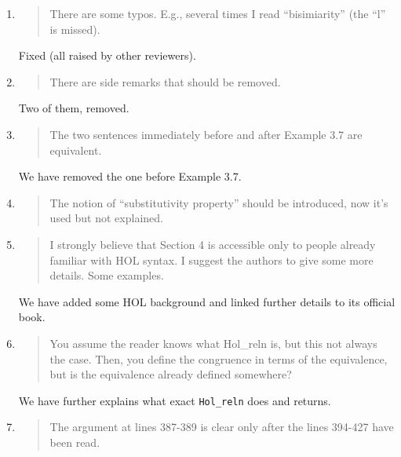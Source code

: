 \begin{enumerate}

\item \begin{quote}
    There are some typos. E.g., several times I read “bisimiarity” (the “l” is missed).
  \end{quote}

  Fixed (all raised by other reviewers).
  
\item \begin{quote}
    There are side remarks that should be removed.
  \end{quote}

  Two of them, removed.
  
\item \begin{quote}
    The two sentences immediately before and after Example 3.7 are equivalent.
  \end{quote}

  We have removed the one before Example 3.7.

\item \begin{quote}
    The notion of “substitutivity property” should be introduced, now it’s used but not explained.
  \end{quote}

\item \begin{quote}
    I strongly believe that Section 4 is accessible only to people
    already familiar with HOL syntax. I suggest the authors to give
    some more details. Some examples.
  \end{quote}

  We have added some HOL background and linked further details to its official book.
  
\item \begin{quote}
    You assume the reader knows what Hol_reln is, but this not always the case. 
Then, you define the congruence in terms of the equivalence, but is
the equivalence already defined somewhere?
  \end{quote}

  We have further explains what exact \texttt{Hol_reln} does and returns.
  
\item \begin{quote}
    The argument at lines 387-389 is clear only after the lines 394-427 have been read.
  \end{quote}


\end{enumerate}
